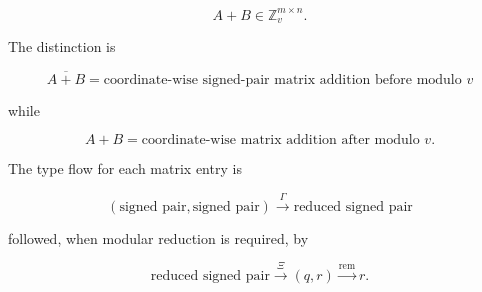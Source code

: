 \documentclass[12pt]{article}
\begin{document}
\[
\boxed{
A+B\in\mathbb Z_v^{m\times n}.
}
\]

The distinction is

\[
\boxed{
\overline{A+B}
=
\text{coordinate-wise signed-pair matrix addition before modulo }v
}
\]

while

\[
\boxed{
A+B
=
\text{coordinate-wise matrix addition after modulo }v.
}
\]

The type flow for each matrix entry is

\[
\boxed{
(\text{signed pair},\text{signed pair})
\overset{\Gamma}{\longrightarrow}
\text{reduced signed pair}
}
\]

followed, when modular reduction is required, by

\[
\boxed{
\text{reduced signed pair}
\overset{\Xi}{\longrightarrow}
(q,r)
\overset{\operatorname{rem}}{\longrightarrow}
r.
}
\]
\end{document}
